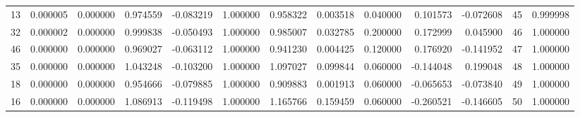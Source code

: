 \begin{tabular}{rrrrrrrrrrrrr}
13 & 0.000005 & 0.000000 & 0.974559 & -0.083219 & 1.000000 & 0.958322 & 0.003518 & 0.040000 & 0.101573 & -0.072608 & 45 & 0.999998 \\
32 & 0.000002 & 0.000000 & 0.999838 & -0.050493 & 1.000000 & 0.985007 & 0.032785 & 0.200000 & 0.172999 & 0.045900 & 46 & 1.000000 \\
46 & 0.000000 & 0.000000 & 0.969027 & -0.063112 & 1.000000 & 0.941230 & 0.004425 & 0.120000 & 0.176920 & -0.141952 & 47 & 1.000000 \\
35 & 0.000000 & 0.000000 & 1.043248 & -0.103200 & 1.000000 & 1.097027 & 0.099844 & 0.060000 & -0.144048 & 0.199048 & 48 & 1.000000 \\
18 & 0.000000 & 0.000000 & 0.954666 & -0.079885 & 1.000000 & 0.909883 & 0.001913 & 0.060000 & -0.065653 & -0.073840 & 49 & 1.000000 \\
16 & 0.000000 & 0.000000 & 1.086913 & -0.119498 & 1.000000 & 1.165766 & 0.159459 & 0.060000 & -0.260521 & -0.146605 & 50 & 1.000000 \\
\bottomrule
\end{tabular}
